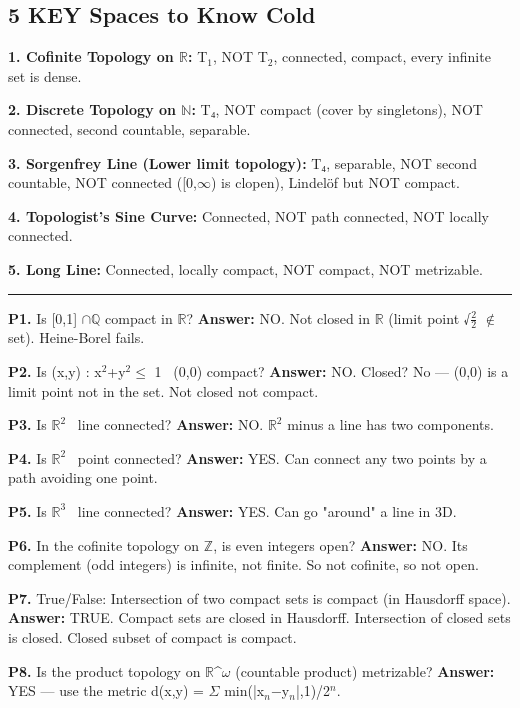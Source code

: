 \documentclass[12pt,a4paper,openany]{book}
\begin{document}
{{\subsection{5 KEY Spaces to Know Cold}

\textbf{1. Cofinite Topology on $\mathbb{R}$:} T$_1$, NOT T$_2$, connected, compact, every infinite set is dense.

\textbf{2. Discrete Topology on $\mathbb{N}$:} T₄, NOT compact (cover by singletons), NOT connected, second countable, separable.

\textbf{3. Sorgenfrey Line (Lower limit topology):} T₄, separable, NOT second countable, NOT connected ([0,$\infty$) is clopen), Lindelöf but NOT compact.

\textbf{4. Topologist's Sine Curve:} Connected, NOT path connected, NOT locally connected.

\textbf{5. Long Line:} Connected, locally compact, NOT compact, NOT metrizable.

\bigskip\noindent\rule{\textwidth}{0.4pt}\bigskip


\textbf{P1.} Is [0,1] $\cap\mathbb{Q}$ compact in $\mathbb{R}$? 
\textbf{Answer:} NO. Not closed in $\mathbb{R}$ (limit point √$\frac{2}{2}$ $\notin$ set). Heine-Borel fails.

\textbf{P2.} Is {(x,y) : x$^2$+y$^2\leq$ 1} \ {(0,0)} compact?
\textbf{Answer:} NO. Closed? No — (0,0) is a limit point not in the set. Not closed  not compact.

\textbf{P3.} Is $\mathbb{R}^2$ \ {line} connected?
\textbf{Answer:} NO. $\mathbb{R}^2$ minus a line has two components.

\textbf{P4.} Is $\mathbb{R}^2$ \ {point} connected?
\textbf{Answer:} YES. Can connect any two points by a path avoiding one point.

\textbf{P5.} Is $\mathbb{R}^3$ \ {line} connected?
\textbf{Answer:} YES. Can go "around" a line in 3D.

\textbf{P6.} In the cofinite topology on $\mathbb{Z}$, is {even integers} open?
\textbf{Answer:} NO. Its complement (odd integers) is infinite, not finite. So not cofinite, so not open.

\textbf{P7.} True/False: Intersection of two compact sets is compact (in Hausdorff space).
\textbf{Answer:} TRUE. Compact sets are closed in Hausdorff. Intersection of closed sets is closed. Closed subset of compact is compact.

\textbf{P8.} Is the product topology on $\mathbb{R}$^$\omega$ (countable product) metrizable?
\textbf{Answer:} YES — use the metric d(x,y) = $\Sigma$ min(|x$_n$−y$_n$|,1)/2$^n$.

}}
\end{document}
